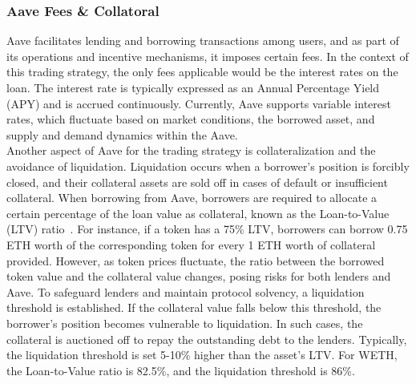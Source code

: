 \subsubsection{Aave Fees \& Collatoral}
Aave facilitates lending and borrowing transactions among users, and as part of its operations and incentive mechanisms, it imposes certain fees. In the context of this trading strategy, the only fees applicable would be the interest rates on the loan. The interest rate is typically expressed as an Annual Percentage Yield (APY) and is accrued continuously. Currently, Aave supports variable interest rates, which fluctuate based on market conditions, the borrowed asset, and supply and demand dynamics within the Aave.
\\[5mm]
Another aspect of Aave for the trading strategy is collateralization and the avoidance of liquidation. Liquidation occurs when a borrower's position is forcibly closed, and their collateral assets are sold off in cases of default or insufficient collateral. When borrowing from Aave, borrowers are required to allocate a certain percentage of the loan value as collateral, known as the Loan-to-Value (LTV) ratio~\cite{aave_risk}. For instance, if a token has a 75\% LTV, borrowers can borrow 0.75 ETH worth of the corresponding token for every 1 ETH worth of collateral provided. However, as token prices fluctuate, the ratio between the borrowed token value and the collateral value changes, posing risks for both lenders and Aave. To safeguard lenders and maintain protocol solvency, a liquidation threshold is established. If the collateral value falls below this threshold, the borrower's position becomes vulnerable to liquidation. In such cases, the collateral is auctioned off to repay the outstanding debt to the lenders. Typically, the liquidation threshold is set 5-10\% higher than the asset's LTV. For WETH, the Loan-to-Value ratio is 82.5\%, and the liquidation threshold is 86\%.

